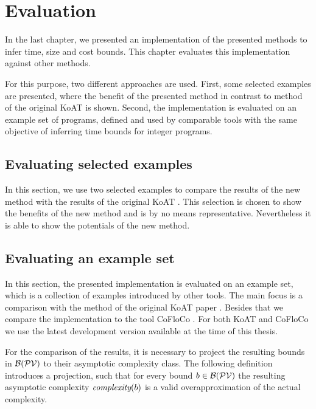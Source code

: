 \section{Evaluation}

In the last chapter, we presented an implementation of the presented methods to infer time, size and cost bounds.
This chapter evaluates this implementation against other methods.

For this purpose, two different approaches are used.
First, some selected examples are presented, where the benefit of the presented method in contrast to method of the original KoAT \cite{koat} is shown.
Second, the implementation is evaluated on an example set of programs, defined and used by comparable tools with the same objective of inferring time bounds for integer programs.

\subsection{Evaluating selected examples}

In this section, we use two selected examples to compare the results of the new method with the results of the original KoAT \cite{koat}.
This selection is chosen to show the benefits of the new method and is by no means representative.
Nevertheless it is able to show the potentials of the new method.

\iffalse\fi

\subsection{Evaluating an example set}

In this section, the presented implementation is evaluated on an example set, which is a collection of examples introduced by other tools.
The main focus is a comparison with the method of the original KoAT paper \cite{koat}.
Besides that we compare the implementation to the tool CoFloCo \cite{cofloco3}.
For both KoAT and CoFloCo we use the latest development version available at the time of this thesis.

For the comparison of the results, it is necessary to project the resulting bounds in $\mathcal{B}(\mathcal{PV})$ to their asymptotic complexity class.
The following definition introduces a projection, such that for every bound $b \in \mathcal{B}(\mathcal{PV})$ the resulting asymptotic complexity $\emph{complexity}(b)$ is a valid overapproximation of the actual complexity.

